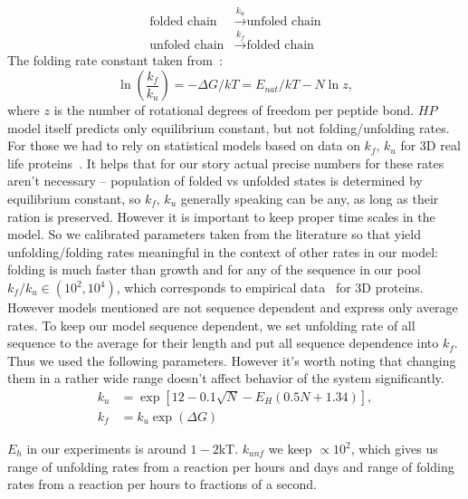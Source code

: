 \documentclass[5p,times]{elsarticle}
\newcommand*{\gD}{\Delta}
\newcommand*{\pt}[1]{\left( #1\right)}
\begin{document}
\begin{itemize}
\begin{equation}
\begin{split}
 \mbox{folded chain}&\xrightarrow{k_u}\mbox{unfoled chain}  \\
 \mbox{unfoled chain}&\xrightarrow{k_f}\mbox{folded chain}
\end{split}
\end{equation}
The folding rate constant taken 
from~\cite{Ghosh2009}:
\begin{equation}
 \ln\pt{\frac{k_f}{k_u}}=-\gD G/kT = E_{nat}/kT-N\ln z,
\end{equation} 
 where $z$ is the number of rotational degrees of freedom per peptide bond.
 $HP$ model itself predicts only equilibrium constant, but not folding/unfolding rates.
 For those we had to rely on statistical models based on data on $k_f,\,k_u$ for 3D real life 
proteins~\cite{Ghosh2010,Dill2011}.
It helps that for our story actual precise numbers for these rates aren't necessary -- population 
of folded vs unfolded states is determined by equilibrium constant, so $k_f,\,k_u$ generally 
speaking can be any, as long as their ration is preserved. However it is important to keep proper 
time scales in the model. So we calibrated parameters taken from the literature so that yield 
unfolding/folding rates meaningful in the context of other rates in our model: folding is much 
faster than growth and for any of the sequence in our pool $k_f/k_u\in (10^2,10^4)$, which 
corresponds to empirical data~\cite{Ghosh2010,Dill2011} for 3D proteins.
However models mentioned are not sequence dependent and express only average rates. To keep our 
model sequence dependent, we set unfolding rate of all sequence to the average for their length 
and put all sequence dependence into $k_f$. Thus we used the following parameters. However it's 
worth noting that changing them in a rather wide range doesn't affect behavior of the system 
significantly.
\begin{equation}
\begin{split}
  k_u &= \exp[12-0.1 \sqrt{N} -E_H(0.5 N + 1.34)],\\
  k_f &= k_u\exp(\gD G)
\end{split}
\end{equation}

$E_h$ in our experiments is around $1-2$kT. $k_{unf}$ we keep $\propto 10^2$, which 
gives us range of unfolding rates from a reaction per hours and days and range of folding rates 
from a reaction per hours to fractions of a second.


\end{itemize}
\end{document}
